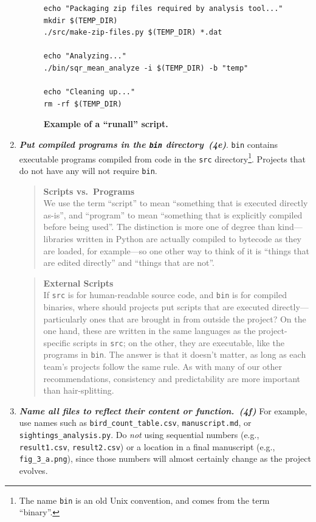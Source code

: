 \documentclass[10pt,letterpaper]{article}
\newcommand{\practice}[2]{\textbf{\emph{{#2}~({#1})}}}
\begin{document}
\begin{enumerate}
\begin{figure}
{\begin{verbatim}
echo "Packaging zip files required by analysis tool..."
mkdir $(TEMP_DIR)
./src/make-zip-files.py $(TEMP_DIR) *.dat

echo "Analyzing..."
./bin/sqr_mean_analyze -i $(TEMP_DIR) -b "temp"

echo "Cleaning up..."
rm -rf $(TEMP_DIR)
\end{verbatim}
}
\caption{\textbf{Example of a ``runall'' script.}}
\label{fig:script}
\end{figure}

\item

  \practice{4e}{Put compiled programs in the \texttt{bin} directory}.
  \texttt{bin} contains executable programs compiled from code in the
  \texttt{src} directory\footnote{The name \texttt{bin} is an old Unix
  convention, and comes from the term ``binary''.}. Projects that
  do not have any will not require \texttt{bin}.

\pagebreak

  \begin{quote}
    \noindent \textbf{Scripts vs.\ Programs}
    \\
    We use the term ``script'' to mean ``something that is executed
    directly as-is'', and ``program'' to mean ``something that is
    explicitly compiled before being used''.  The distinction is more
    one of degree than kind---libraries written in Python are actually
    compiled to bytecode as they are loaded, for example---so one
    other way to think of it is ``things that are edited directly''
    and ``things that are not''.
  \end{quote}

  \begin{quote}
    \noindent \textbf{External Scripts}
    \\
    If \texttt{src} is for human-readable source code, and
    \texttt{bin} is for compiled binaries, where should projects put
    scripts that are executed directly---particularly ones that are
    brought in from outside the project?  On the one hand, these are
    written in the same languages as the project-specific scripts in
    \texttt{src}; on the other, they are executable, like the programs
    in \texttt{bin}.  The answer is that it doesn't matter, as long as
    each team's projects follow the same rule.  As with many of our
    other recommendations, consistency and predictability are more
    important than hair-splitting.
  \end{quote}

\item

  \practice{4f}{Name all files to reflect their content or function.}
  For example, use names such as \texttt{bird\_count\_table.csv},
  \texttt{manuscript.md}, or \texttt{sightings\_analysis.py}.  Do
  \emph{not} using sequential numbers (e.g., \texttt{result1.csv},
  \texttt{result2.csv}) or a location in a final manuscript (e.g.,
  \texttt{fig\_3\_a.png}), since those numbers will almost certainly
  change as the project evolves.

\end{enumerate}
\end{document}
